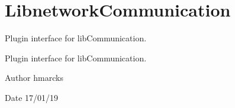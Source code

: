\hypertarget{group__libnetworkCommunication}{}\section{Libnetwork\+Communication}
\label{group__libnetworkCommunication}


Plugin interface for lib\+Communication.  


Plugin interface for lib\+Communication. 

\begin{DoxyAuthor}{Author}
hmarcks
\end{DoxyAuthor}
\begin{DoxyDate}{Date}
17/01/19 
\end{DoxyDate}
